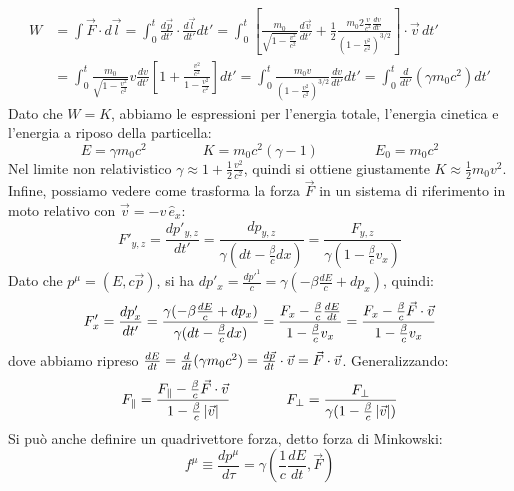 \begin{equation}
	\begin{split}
		W &= \int \vec{F}\cdot d\vec{l} = \int_0^t \displaystyle\frac{d\vec{p}}{dt'}\cdot \displaystyle\frac{d\vec{l}}{dt'} dt' = \int_0^t \left[ \displaystyle\frac{m_0}{\sqrt{1 - \frac{v^2}{c^2}}} \displaystyle\frac{d\vec{v}}{dt'} + \frac{1}{2}\displaystyle\frac{m_0 2\frac{v}{c^2}\frac{dv}{dt'}}{\left(1 - \frac{v^2}{c^2}\right)^{3/2}} \right] \cdot\vec{v}\, dt' \\ 
		  &= \int_0^t \displaystyle\frac{m_0}{\sqrt{1-\frac{v^2}{c^2}}} v \displaystyle\frac{dv}{dt'} \left[ 1 + \displaystyle\frac{\frac{v^2}{c^2}}{1 - \frac{v^2}{c^2}}\right] dt' = \int_0^t \displaystyle\frac{m_0 v}{\left(1-\frac{v^2}{c^2}\right)^{3/2}} \displaystyle\frac{dv}{dt'} dt' = \int_0^t \displaystyle\frac{d}{dt'}\left(\gamma m_0 c^2\right)dt'
	\end{split}
	\label{eq:21}
\end{equation}
Dato che $ W = K $, abbiamo le espressioni per l'energia totale, l'energia cinetica e l'energia a riposo della particella:
\begin{equation}
	E = \gamma m_0 c^2 \qquad\qquad K = m_0 c^2 (\gamma-1) \qquad\qquad E_0 = m_0 c^2
	\label{eq:22}
\end{equation}
Nel limite non relativistico $ \gamma \approx 1 + \frac{1}{2}\frac{v^2}{c^2} $, quindi si ottiene giustamente $ K \approx \frac{1}{2} m_0 v^2 $. \\ 
Infine, possiamo vedere come trasforma la forza $ \vec{F} $ in un sistema di riferimento in moto relativo con $ \vec{v} = -v\,\hat{e}_x $:
\begin{equation}
	F'_{y,z} = \displaystyle\frac{dp'_{y,z}}{dt'} = \displaystyle\frac{dp_{y,z}}{\gamma (dt - \frac{\beta}{c}dx)} = \displaystyle\frac{F_{y,z}}{\gamma (1 - \frac{\beta}{c} v_x)}
	\label{eq:23}
\end{equation}
Dato che $ p^{\mu} = (E, c\vec{p}) $, si ha $ dp'_x = \frac{dp'^1}{c} = \gamma (-\beta \frac{dE}{c} + dp_x) $, quindi:
\begin{equation}
	F'_x = \displaystyle\frac{dp'_x}{dt'} = \displaystyle\frac{\gamma (-\beta \frac{dE}{c} + dp_x)}{\gamma (dt - \frac{\beta}{c} dx)} = \displaystyle\frac{F_x - \frac{\beta}{c}\frac{dE}{dt}}{1 - \frac{\beta}{c}v_x} = \displaystyle\frac{F_x - \frac{\beta}{c}\vec{F}\cdot\vec{v}}{1 - \frac{\beta}{c} v_x}
	\label{eq:24}
\end{equation}
dove abbiamo ripreso $ \frac{dE}{dt} = \frac{d}{dt}(\gamma m_0 c^2) = \frac{d\vec{p}}{dt}\cdot\vec{v}=\vec{F}\cdot\vec{v} $. Generalizzando:
\begin{equation}
	F_{\parallel} = \displaystyle\frac{F_{\parallel} - \frac{\beta}{c}\vec{F}\cdot\vec{v}}{1 - \frac{\beta}{c} \left\lvert\vec{v}\right\rvert} \qquad\qquad F_{\perp} = \displaystyle\frac{F_{\perp}}{\gamma (1 - \frac{\beta}{c} \left\lvert\vec{v}\right\rvert)}
	\label{eq:25}
\end{equation}
Si può anche definire un quadrivettore forza, detto forza di Minkowski:
\begin{equation}
	f^{\mu} \equiv \displaystyle\frac{dp^{\mu}}{d\tau} = \gamma \left(\displaystyle\frac{1}{c}\displaystyle\frac{dE}{dt}, \vec{F}\right)
	\label{eq:26}
\end{equation}

